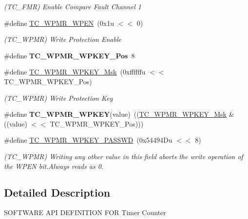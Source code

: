 \begin{DoxyCompactItemize}
\begin{DoxyCompactList}\small\item\em (T\+C\+\_\+\+F\+MR) Enable Compare Fault Channel 1 \end{DoxyCompactList}\item 
\mbox{\label{group__SAMS70__TC_ga8d7a567f57170fe4ba4277910eba2696}} 
\#define \mbox{\hyperlink{group__SAMS70__TC_ga8d7a567f57170fe4ba4277910eba2696}{T\+C\+\_\+\+W\+P\+M\+R\+\_\+\+W\+P\+EN}}~(0x1u $<$$<$ 0)
\begin{DoxyCompactList}\small\item\em (T\+C\+\_\+\+W\+P\+MR) Write Protection Enable \end{DoxyCompactList}\item 
\mbox{\label{group__SAMS70__TC_gaaf064db5e99cb63d2bdef0cf72712e20}} 
\#define {\bfseries T\+C\+\_\+\+W\+P\+M\+R\+\_\+\+W\+P\+K\+E\+Y\+\_\+\+Pos}~8
\item 
\mbox{\label{group__SAMS70__TC_gaa4d7b0a1655bf8ad889ea5eee9918c15}} 
\#define \mbox{\hyperlink{group__SAMS70__TC_gaa4d7b0a1655bf8ad889ea5eee9918c15}{T\+C\+\_\+\+W\+P\+M\+R\+\_\+\+W\+P\+K\+E\+Y\+\_\+\+Msk}}~(0xffffffu $<$$<$ T\+C\+\_\+\+W\+P\+M\+R\+\_\+\+W\+P\+K\+E\+Y\+\_\+\+Pos)
\begin{DoxyCompactList}\small\item\em (T\+C\+\_\+\+W\+P\+MR) Write Protection Key \end{DoxyCompactList}\item 
\mbox{\label{group__SAMS70__TC_gad9651444d0660a932cca46764204160b}} 
\#define {\bfseries T\+C\+\_\+\+W\+P\+M\+R\+\_\+\+W\+P\+K\+EY}(value)~((\mbox{\hyperlink{group__SAMV71__TC_gaa4d7b0a1655bf8ad889ea5eee9918c15}{T\+C\+\_\+\+W\+P\+M\+R\+\_\+\+W\+P\+K\+E\+Y\+\_\+\+Msk}} \& ((value) $<$$<$ T\+C\+\_\+\+W\+P\+M\+R\+\_\+\+W\+P\+K\+E\+Y\+\_\+\+Pos)))
\item 
\mbox{\label{group__SAMS70__TC_ga9ea243bbd57d7aaffd1d7c9d41bffd12}} 
\#define \mbox{\hyperlink{group__SAMS70__TC_ga9ea243bbd57d7aaffd1d7c9d41bffd12}{T\+C\+\_\+\+W\+P\+M\+R\+\_\+\+W\+P\+K\+E\+Y\+\_\+\+P\+A\+S\+S\+WD}}~(0x54494\+Du $<$$<$ 8)
\begin{DoxyCompactList}\small\item\em (T\+C\+\_\+\+W\+P\+MR) Writing any other value in this field aborts the write operation of the W\+P\+EN bit.\+Always reads as 0. \end{DoxyCompactList}\end{DoxyCompactItemize}


\subsection{Detailed Description}
S\+O\+F\+T\+W\+A\+RE A\+PI D\+E\+F\+I\+N\+I\+T\+I\+ON F\+OR Timer Counter 